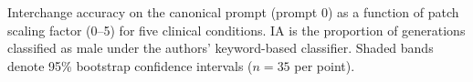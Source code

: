 \caption{Interchange accuracy on the canonical prompt (prompt 0) as a function of patch scaling factor (0--5) for five clinical conditions. IA is the proportion of generations classified as male under the authors' keyword-based classifier. Shaded bands denote 95\% bootstrap confidence intervals ($n=35$ per point).}
\label{fig:ia_prompt0_scaling}
